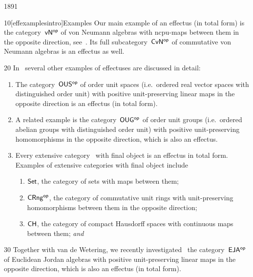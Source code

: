 \begin{parsec}{1891}%
\begin{point}{10}[effexamplesintro]{Examples}%
Our main example of an effectus (in total form)
    is the category~${\mathsf{vN}}{^{\mathsf{op}}}$ of von Neumann algebras with
    ncpu-maps between them in the opposite direction,
        see~.
Its full subcategory~${\mathsf{CvN}}{^{\mathsf{op}}}$ of commutative von Neumann algebras
    is an effectus as well. 
\begin{point}{20}%
In~\cite{effintro} several other examples of effectuses are
    discussed in detail:
\begin{enumerate}
\item
    The category~${\mathsf{OUS}}{^{\mathsf{op}}}$ of order unit spaces
        (i.e.~ordered real vector spaces with distinguished order unit)
        with positive unit-preserving linear maps in the opposite
        direction is an effectus (in total form). 
\item
    A related example is the category~${\mathsf{OUG}}{^{\mathsf{op}}}$ of order unit groups
        (i.e.~ordered abelian groups with distinguished order unit)
        with positive
        unit-preserving homomorphisms in the opposite direction,
        which is also an effectus. 
\item
    Every extensive category~\cite{carboni1993introduction}
        with final object is an effectus in total form.
    Examples of extensive categories with final object
            include
    \begin{enumerate}
        \item $\mathsf{Set}$, the category
            of sets with maps between them; 
        \item ${\mathsf{CRng}}{^{\mathsf{op}}}$, the category
            of commutative unit rings with unit-preserving
            homomorphisms between them
            in the opposite direction; 
        \item $\mathsf{CH}$, the category of
            compact Hausdorff spaces with continuous maps
            between them;  \emph{and}
    \end{enumerate}
\end{enumerate}
\end{point}
\spacingfix{}
\begin{point}{30}%
    Together with van de Wetering, we recently investigated~\cite{eja}
    the category~${\mathsf{EJA}}{^{\mathsf{op}}}$ of Euclidean Jordan algebras
    with positive unit-preserving linear maps
    in the opposite direction, which is also an effectus (in total form).
\end{point}
\end{point}
\end{parsec}

